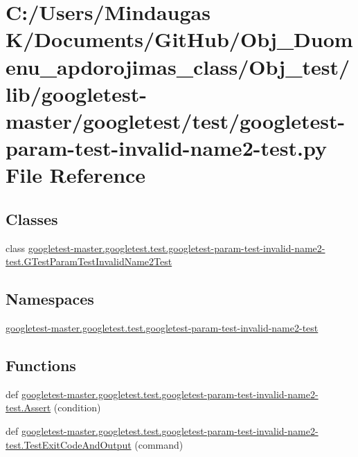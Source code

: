 \hypertarget{_obj__test_2lib_2googletest-master_2googletest_2test_2googletest-param-test-invalid-name2-test_8py}{}\section{C\+:/\+Users/\+Mindaugas K/\+Documents/\+Git\+Hub/\+Obj\+\_\+\+Duomenu\+\_\+apdorojimas\+\_\+class/\+Obj\+\_\+test/lib/googletest-\/master/googletest/test/googletest-\/param-\/test-\/invalid-\/name2-\/test.py File Reference}
\label{_obj__test_2lib_2googletest-master_2googletest_2test_2googletest-param-test-invalid-name2-test_8py}
\subsection*{Classes}
\begin{DoxyCompactItemize}
\item 
class \mbox{\hyperlink{classgoogletest-master_1_1googletest_1_1test_1_1googletest-param-test-invalid-name2-test_1_1_g_tff88aa7127808d8f576f122583350856}{googletest-\/master.\+googletest.\+test.\+googletest-\/param-\/test-\/invalid-\/name2-\/test.\+G\+Test\+Param\+Test\+Invalid\+Name2\+Test}}
\end{DoxyCompactItemize}
\subsection*{Namespaces}
\begin{DoxyCompactItemize}
\item 
 \mbox{\hyperlink{namespacegoogletest-master_1_1googletest_1_1test_1_1googletest-param-test-invalid-name2-test}{googletest-\/master.\+googletest.\+test.\+googletest-\/param-\/test-\/invalid-\/name2-\/test}}
\end{DoxyCompactItemize}
\subsection*{Functions}
\begin{DoxyCompactItemize}
\item 
def \mbox{\hyperlink{namespacegoogletest-master_1_1googletest_1_1test_1_1googletest-param-test-invalid-name2-test_a08dffe47cfae32a14acec6707be3b938}{googletest-\/master.\+googletest.\+test.\+googletest-\/param-\/test-\/invalid-\/name2-\/test.\+Assert}} (condition)
\item 
def \mbox{\hyperlink{namespacegoogletest-master_1_1googletest_1_1test_1_1googletest-param-test-invalid-name2-test_a4afd04cd5c39aa2d0b2ff2528d204c94}{googletest-\/master.\+googletest.\+test.\+googletest-\/param-\/test-\/invalid-\/name2-\/test.\+Test\+Exit\+Code\+And\+Output}} (command)
\end{DoxyCompactItemize}
